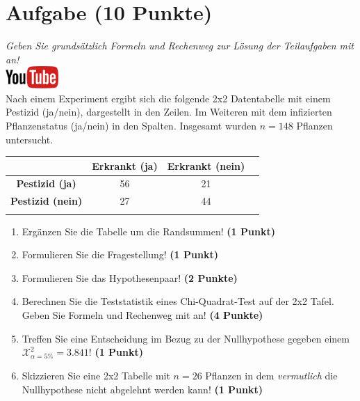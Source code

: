 \documentclass[a4paper, 10pt]{scrartcl}\usepackage[]{graphicx}\usepackage[]{xcolor}
\begin{document}
\section{Aufgabe \hfill (10 Punkte)}

\textit{Geben Sie grunds{\"a}tzlich Formeln und Rechenweg zur L{\"o}sung der
  Teilaufgaben mit an!} \\[1Ex]

\hfill\href{https://youtu.be/PVUK0zdkZkk}{\includegraphics[width =
  2cm]{img/youtube}}\\[1Ex]




Nach einem Experiment ergibt sich die folgende 2x2 Datentabelle mit einem
Pestizid (ja/nein), dargestellt in den Zeilen. Im Weiteren mit dem
infizierten Pflanzenstatus (ja/nein) in den Spalten. Insgesamt wurden
$n = 148$ Pflanzen untersucht.
\vspace{5Ex}

\begin{center}
  \Large
  \begin{tabular}{c|c|c|c}
     & \textbf{Erkrankt (ja)} & \textbf{Erkrankt (nein)} &  \strut\\
    \hline
    \textbf{Pestizid (ja)} & 56  & 21  &     \strut\\
    \hline
    \textbf{Pestizid (nein)} & 27  & 44  &      \strut\\
    \hline
     \phantom{100} & \phantom{100}  & \phantom{100}  &  \phantom{100}  \strut\\
  \end{tabular}
\end{center}

\vspace{5Ex}

\begin{enumerate}
\item Erg{\"a}nzen Sie die Tabelle um die Randsummen! \textbf{(1 Punkt)} 
\item Formulieren Sie die Fragestellung! \textbf{(1 Punkt)}
\item Formulieren Sie das Hypothesenpaar! \textbf{(2 Punkte)}
\item Berechnen Sie die Teststatistik eines Chi-Quadrat-Test auf der 2x2
  Tafel. Geben Sie Formeln und Rechenweg mit an! \textbf{(4 Punkte)}
\item Treffen Sie eine Entscheidung im Bezug zu der Nullhypothese gegeben
  einem $\mathcal{X}^2_{\alpha = 5\%} = 3.841$! \textbf{(1 Punkt)}
\item Skizzieren Sie eine 2x2 Tabelle mit
  $n = 26$ Pflanzen in dem \textit{vermutlich}
  die Nullhypothese nicht abgelehnt werden kann! \textbf{(1 Punkt)}
\end{enumerate} 
\clearpage
\end{document}
